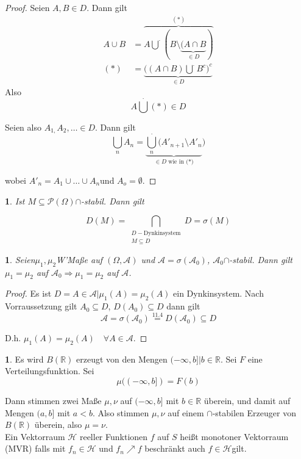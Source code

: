 \documentclass[10pt,a4paper]{report}
\numberwithin{equation}{section}
\numberwithin{figure}{section}
\theoremstyle{plain}
\theoremstyle{definition}
\newtheorem{example}[thm]{\protect\examplename}
\theoremstyle{remark}
\theoremstyle{plain}
\newtheorem{prop}[thm]{\protect\propositionname}
\providecommand{\examplename}{Beispiel}
\providecommand{\propositionname}{Satz}
\newcommand{\1}{ \mathbb{1} } %
\begin{document}
\begin{proof}
  Seien $A,B\in D$. Dann gilt
  \begin{align*}
    A\cup B & =\overbrace{A{\displaystyle \bigcup^{\cdot}(B\setminus\underbrace{(A\cap B}_{\in D})}}^{(*)}\\
    (*) & =\underbrace{((A\cap B){\displaystyle
        \bigcup^{\cdot}B^{c})}^{c}}_{\in D}
  \end{align*}
  Also
  \[
  A{\displaystyle \bigcup^{\cdot}(*)\in D}
  \]

  Seien also $A_{1,}A_{2},\ldots\in D$. Dann gilt
  \[ {\displaystyle \bigcup_{n}A_{n}=\underbrace{{\displaystyle
        \bigcup_{n}^{\cdot}(A'_{n+1}\setminus}A'_{n}}_{\in D\text{ wie
        in (*)}})}
  \]

  wobei $A'_{n}=A_{1}\cup\ldots\cup A_{n}$und $A_{o}=\emptyset$.
\end{proof}
\begin{prop}
  Ist $M\subseteq\mathcal{P}(\Omega)$$\cap$-stabil. Dann gilt

\[
D(M)={\displaystyle \bigcap_{\substack{D-\text{Dynkinsystem}\\
      M\subseteq D } }D=\sigma(M)}
\]
\end{prop}
\begin{prop}
  Seien$\mu_{1},\mu_{2}$W'Maße auf $(\Omega,\mathcal{A})$ und
  $\mathcal{A}=\sigma(\mathcal{A}_{0})$,
  $\mathcal{A}_{0}$$\cap$-stabil. Dann gilt $\mu_{1}=\mu_{2}$ auf
  $\mathcal{A}_{0}\Rightarrow\mu_{1}=\mu_{2}$ auf $\mathcal{A}$.
\end{prop}
\begin{proof}
  Es ist $D={A\in\mathcal{A}|\mu_{1}(A)=\mu_{2}(A)}$ ein Dynkinsystem.
  Nach Vorraussetzung gilt $A_{0}\subseteq D$, $D(A_{0})\subseteq D$
  dann gilt
  \[
  \mathcal{A}=\sigma(\mathcal{A}_{0})\overset{\text{11.4}}{=}D(\mathcal{A}_{0})\subseteq
  D
  \]


  D.h. $\mu_{1}(A)=\mu_{2}(A)\quad\forall A\in\mathcal{A}$.
\end{proof}
\begin{example}
  Es wird $B(\mathbb{R})$ erzeugt von den Mengen
  ${(-\infty,b]|b\in\mathbb{R}}$.  Sei $F$ eine
  Verteilungsfunktion. Sei
  \[
  \mu((-\infty,b])=F(b)
  \]

  Dann stimmen zwei Maße $\mu,\nu$ auf $(-\infty,b]$ mit
  $b\in\mathbb{R}$ überein, und damit auf Mengen $(a,b]$ mit
  $a<b$. Also stimmen $\mu,\nu$ auf einem $\cap$-stabilen Erzeuger von
  $B(\mathbb{R})$ überein,
  also $\mu=\nu$. \\
  Ein Vektorraum $\mathcal{H}$ reeller Funktionen $f$ auf $S$ heißt
  monotoner Vektorraum (MVR) falls mit $f_{n}\in\mathcal{H}$ und
  $f_{n}\nearrow f$
  beschränkt auch $f\in\mathcal{H}$gilt.
\end{example}
\end{document}
